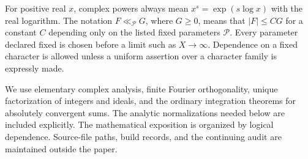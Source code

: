 For positive real $x$, complex powers always mean
$x^s=\exp(s\log x)$ with the real logarithm. The notation
$F\ll_{\mathcal P}G$, where $G\geq0$, means that $|F|\leq CG$ for a
constant $C$ depending only on the listed fixed parameters $\mathcal P$.
Every parameter declared fixed is chosen before a limit such as
$X\to\infty$. Dependence on a fixed character is allowed unless a
uniform assertion over a character family is expressly made.

We use elementary complex analysis, finite Fourier orthogonality,
unique factorization of integers and ideals, and the ordinary integration
theorems for absolutely convergent sums. The analytic normalizations
needed below are included explicitly. The mathematical exposition is
organized by logical dependence. Source-file paths, build records, and
the continuing audit are maintained outside the paper.
